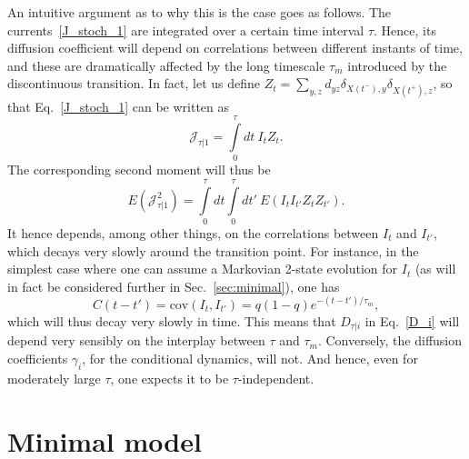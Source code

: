 \documentclass[aps,pre,reprint, amsmath, amssymb,superscriptaddress]{revtex4-1}
\newcommand{\Cov}{\text{cov}}
\begin{document}
An intuitive argument as to why this is the case  goes as follows. 
The currents~\eqref{J_stoch_1} are integrated over a certain time interval $\tau$. 
Hence, its diffusion coefficient will depend on correlations between different instants of time, and these are dramatically affected by the long timescale $\tau_m$ introduced by the discontinuous transition.
In fact, let us define $Z_t = \sum_{y,z} d_{yz} \delta_{X(t^-), y} \delta_{X(t^+),z}$, so that Eq.~\eqref{J_stoch_1} can be written as 
\begin{equation}
    \mathcal{J}_{\tau|1} = \int\limits_0^\tau dt~I_t Z_t. 
\end{equation}
The corresponding second moment will thus be 
\begin{equation}\label{cond_2nd_moment_partial}
    E(\mathcal{J}_{\tau|1}^2) = \int\limits_0^\tau dt\int\limits_0^\tau dt'~ E(I_t I_{t'} Z_t Z_{t'}).
\end{equation}
It hence depends, among other things, on the correlations between $I_t$ and $I_{t'}$, which decays very slowly around the transition point. 
For instance, in the simplest case where one can assume a Markovian 2-state evolution for $I_t$ (as will in fact be considered further in Sec.~\ref{sec:minimal}), one has 
\begin{equation}\label{2_time_corr}
    C(t-t') = \Cov(I_t, I_{t'}) = q(1-q) e^{-(t-t')/\tau_m},
\end{equation}
which will thus decay very slowly in time. 
This means that  $D_{\tau|i}$ in Eq.~\eqref{D_i} will depend very sensibly on the interplay between $\tau$ and $\tau_m$. 
Conversely, the diffusion coefficients $\gamma_i$, for the conditional dynamics, will not.
And hence, even for moderately large $\tau$, one expects it to be $\tau$-independent. 



%
%
\section{\label{sec:minimal}Minimal model}
%
%
\end{document}
